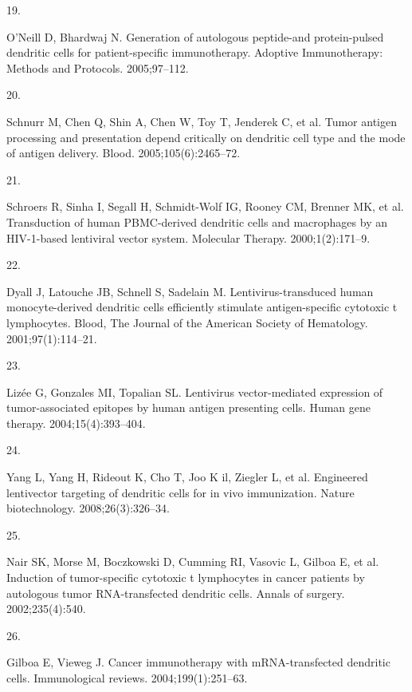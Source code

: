 \documentclass[
]{article}
\newlength{\cslhangindent}
\newlength{\csllabelwidth}
\newenvironment{CSLReferences}[2] %
 {\begin{list}{}{%
  \setlength{\itemindent}{0pt}
  \setlength{\leftmargin}{0pt}
  \setlength{\parsep}{0pt}
  \ifodd #1
   \setlength{\leftmargin}{\cslhangindent}
   \setlength{\itemindent}{-1\cslhangindent}
  \fi
  \setlength{\itemsep}{#2\baselineskip}}}
 {\end{list}}
\newcommand{\CSLLeftMargin}[1]{\parbox[t]{\csllabelwidth}{\strut#1\strut}}
\newcommand{\CSLRightInline}[1]{\parbox[t]{\linewidth - \csllabelwidth}{\strut#1\strut}}
\begin{document}
\begin{CSLReferences}{0}{1}
\CSLLeftMargin{19. }%
\CSLRightInline{O'Neill D, Bhardwaj N. Generation of autologous
peptide-and protein-pulsed dendritic cells for patient-specific
immunotherapy. Adoptive Immunotherapy: Methods and Protocols.
2005;97--112. }

\CSLLeftMargin{20. }%
\CSLRightInline{Schnurr M, Chen Q, Shin A, Chen W, Toy T, Jenderek C, et
al. Tumor antigen processing and presentation depend critically on
dendritic cell type and the mode of antigen delivery. Blood.
2005;105(6):2465--72. }

\CSLLeftMargin{21. }%
\CSLRightInline{Schroers R, Sinha I, Segall H, Schmidt-Wolf IG, Rooney
CM, Brenner MK, et al. Transduction of human PBMC-derived dendritic
cells and macrophages by an HIV-1-based lentiviral vector system.
Molecular Therapy. 2000;1(2):171--9. }

\CSLLeftMargin{22. }%
\CSLRightInline{Dyall J, Latouche JB, Schnell S, Sadelain M.
Lentivirus-transduced human monocyte-derived dendritic cells efficiently
stimulate antigen-specific cytotoxic t lymphocytes. Blood, The Journal
of the American Society of Hematology. 2001;97(1):114--21. }

\CSLLeftMargin{23. }%
\CSLRightInline{Lizée G, Gonzales MI, Topalian SL. Lentivirus
vector-mediated expression of tumor-associated epitopes by human antigen
presenting cells. Human gene therapy. 2004;15(4):393--404. }

\CSLLeftMargin{24. }%
\CSLRightInline{Yang L, Yang H, Rideout K, Cho T, Joo K il, Ziegler L,
et al. Engineered lentivector targeting of dendritic cells for in vivo
immunization. Nature biotechnology. 2008;26(3):326--34. }

\CSLLeftMargin{25. }%
\CSLRightInline{Nair SK, Morse M, Boczkowski D, Cumming RI, Vasovic L,
Gilboa E, et al. Induction of tumor-specific cytotoxic t lymphocytes in
cancer patients by autologous tumor RNA-transfected dendritic cells.
Annals of surgery. 2002;235(4):540. }

\CSLLeftMargin{26. }%
\CSLRightInline{Gilboa E, Vieweg J. Cancer immunotherapy with
mRNA-transfected dendritic cells. Immunological reviews.
2004;199(1):251--63. }


\end{CSLReferences}
\end{document}
